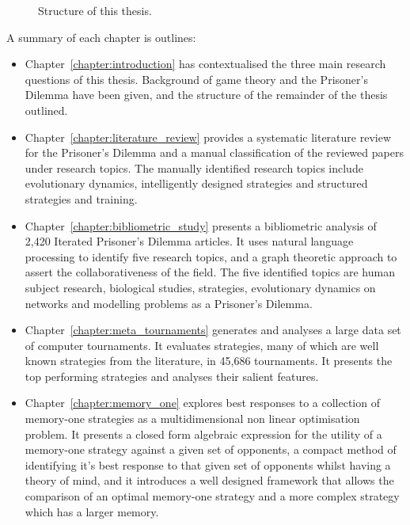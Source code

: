 \begin{figure}[!hbtp]
    \centering
    
    \caption{Structure of this thesis.}\label{fig:structure_of_thesis}
\end{figure}

A summary of each chapter is outlines:

\begin{itemize}
    \item Chapter~\ref{chapter:introduction} has contextualised the three main
    research questions of this thesis. Background of game theory and the
    Prisoner's Dilemma have been given, and the structure
    of the remainder of the thesis outlined.
    \item Chapter~\ref{chapter:literature_review} provides a systematic
    literature review for the Prisoner's Dilemma and a manual classification of
    the reviewed papers under research topics. The manually identified research
    topics include evolutionary dynamics, intelligently designed strategies
    and structured strategies and training.
    \item Chapter~\ref{chapter:bibliometric_study} presents a bibliometric
    analysis of 2,420 Iterated Prisoner's Dilemma articles. It uses natural language processing to
    identify five research topics, and a graph theoretic approach to assert the
    collaborativeness of the field. The five identified topics are human subject
    research, biological studies, strategies, evolutionary dynamics on networks
    and modelling problems as a Prisoner's Dilemma.
    \item Chapter~\ref{chapter:meta_tournaments} generates and analyses a large data set of
    computer tournaments. It evaluates \numberofstrategies strategies, many of
    which are well known strategies from the literature, in 45,686 tournaments.
    It presents the top performing strategies and analyses their salient features.
    \item Chapter~\ref{chapter:memory_one} explores best responses to a
    collection of memory-one strategies as a multidimensional non linear
    optimisation problem. It presents a closed form algebraic expression for the
    utility of a memory-one strategy against a given set of opponents, a
    compact method of identifying it's best response to that given set of
    opponents whilst having a theory of mind, and it introduces a well designed
    framework that allows the comparison of an optimal memory-one strategy and a
    more complex strategy which has a larger memory.

\end{itemize}
